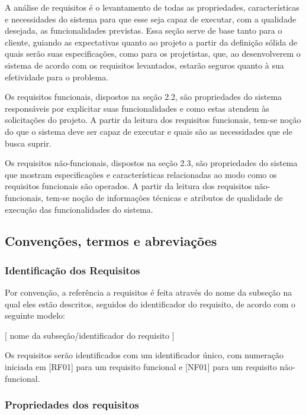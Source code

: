 
A análise de requisitos é o levantamento de todas as propriedades, características e necessidades do sistema para que esse seja capaz de executar, com a qualidade desejada, as funcionalidades previstas. Essa seção serve de base tanto para o cliente, guiando as expectativas quanto ao projeto a partir da definição sólida de quais serão suas especificações, como para os projetistas, que, ao desenvolverem o sistema de acordo com os requisitos levantados, estarão seguros quanto à sua efetividade para o problema.

Os requisitos funcionais, dispostos na seção 2.2, são propriedades do sistema responsáveis por explicitar suas funcionalidades e como estas atendem às solicitações do projeto. A partir da leitura dos requisitos funcionais, tem-se noção do que o sistema deve ser capaz de executar e quais são as necessidades que ele busca suprir.

Os requisitos não-funcionais, dispostos na seção 2.3, são propriedades do sistema que mostram especificações e características relacionadas ao modo como os requisitos funcionais são operados. A partir da leitura dos requisitos não-funcionais, tem-se noção de informações técnicas e atributos de qualidade de execução das funcionalidades do sistema.

\subsection{Convenções, termos e abreviações}

\subsubsection{Identificação dos Requisitos}

Por convenção, a referência a requisitos é feita através do nome da subseção na qual eles
estão descritos, seguidos do identificador do requisito, de acordo com o seguinte modelo:
\begin{center}
    [ nome da subseção/identificador do requisito ]
\end{center}

Os requisitos serão identificados com um identificador único, com numeração iniciada em
[RF01] para um requisito funcional e [NF01] para um requisito não-funcional.

\subsubsection{Propriedades dos requisitos}

